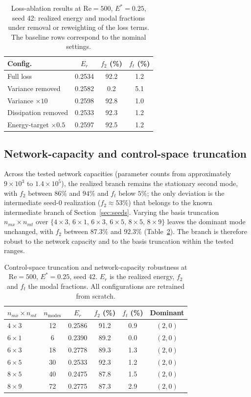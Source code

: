 \documentclass[aip,pof,reprint,superscriptaddress]{revtex4-2}
\newcommand{\re}{\mathrm{Re}}
\begin{document}
\begin{table}[t]
\caption{\label{tab:ablation} Loss-ablation results at $\re=500$, $E^*=0.25$, seed 42: realized energy and modal fractions under removal or reweighting of the loss terms. The baseline rows correspond to the nominal settings.}
\centering
\begin{tabular}{lccc}
\toprule
Config. & $E_r$ & $f_2$ (\%) & $f_t$ (\%) \\
\midrule
Full loss & 0.2534 & 92.2 & 1.2 \\
Variance removed & 0.2582 & 0.2 & 5.1 \\
Variance $\times10$ & 0.2598 & 92.8 & 1.0 \\
Dissipation removed & 0.2533 & 92.3 & 1.2 \\
Energy-target $\times0.5$ & 0.2597 & 92.5 & 1.2 \\
\bottomrule
\end{tabular}
\end{table}

\subsection{Network-capacity and control-space truncation}\label{sec:archmode}

Across the tested network capacities (parameter counts from approximately $9\times10^3$ to $1.4\times10^5$), the realized branch remains the stationary second mode, with $f_2$ between $86\%$ and $94\%$ and $f_t$ below $5\%$; the only deviation is the intermediate seed-0 realization ($f_2\approx53\%$) that belongs to the known intermediate branch of Section~\ref{sec:seeds}. Varying the basis truncation $n_{mx}\times n_{mt}$ over $\{4\times3,\,6\times1,\,6\times3,\,6\times5,\,8\times5,\,8\times9\}$ leaves the dominant mode unchanged, with $f_2$ between $87.3\%$ and $92.3\%$ (Table~\ref{tab:archmode}). The branch is therefore robust to the network capacity and to the basis truncation within the tested ranges.

\begin{table}[t]
\caption{\label{tab:archmode} Control-space truncation and network-capacity robustness at $\re=500$, $E^*=0.25$, seed 42. $E_r$ is the realized energy, $f_2$ and $f_t$ the modal fractions. All configurations are retrained from scratch.}
\centering
\begin{tabular}{lccccc}
\toprule
$n_{mx}\times n_{mt}$ & $n_{\mathrm{modes}}$ & $E_r$ & $f_2$ (\%) & $f_t$ (\%) & Dominant \\
\midrule
$4\times3$ & 12 & 0.2586 & 91.2 & 0.9 & $(2,0)$ \\
$6\times1$ & 6 & 0.2390 & 89.2 & 0.0 & $(2,0)$ \\
$6\times3$ & 18 & 0.2778 & 89.3 & 1.3 & $(2,0)$ \\
$6\times5$ & 30 & 0.2533 & 92.3 & 1.2 & $(2,0)$ \\
$8\times5$ & 40 & 0.2475 & 87.8 & 1.5 & $(2,0)$ \\
$8\times9$ & 72 & 0.2775 & 87.3 & 2.9 & $(2,0)$ \\
\bottomrule
\end{tabular}
\end{table}
\end{document}
